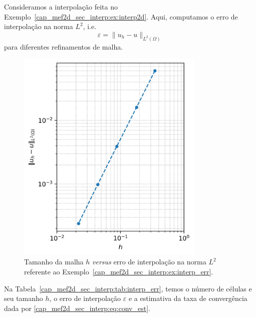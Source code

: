 \begin{ex}\label{cap_mef2d_sec_interp:ex:interp_err}
  Consideramos a interpolação feita no Exemplo~\ref{cap_mef2d_sec_interp:ex:interp2d}. Aqui, computamos o erro de interpolação na norma $L^2$, i.e.
  \begin{equation}
    \varepsilon = \|u_h - u\|_{L^2(\Omega)}
  \end{equation}
  para diferentes refinamentos de malha. 

  \begin{figure}[H]
    \centering
    \includegraphics[width=0.8\textwidth]{cap_mef2d/dados/ex_interp_err/fig}
    \caption{Tamanho da malha $h$ \textit{versus} erro de interpolação na norma $L^2$ referente ao Exemplo~\ref{cap_mef2d_sec_interp:ex:interp_err}.}
  \end{figure}

  Na Tabela~\ref{cap_mef2d_sec_interp:tab:interp_err}, temos o número de células e seu tamanho $h$, o erro de interpolação $\varepsilon$ e a estimativa da taxa de convergência dada por \eqref{cap_mef2d_sec_interp:eq:conv_est}.


\end{ex}
